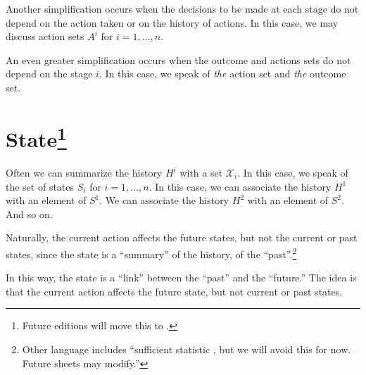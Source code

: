 Another simplification occurs when the decisions to be made at each stage do not depend on the action taken or on the history of actions.
In this case, we may discuss action sets $A^i$ for $i = 1, \dots , n$.

An even greater simplification occurs when the outcome and actions sets do not depend on the stage $i$.
In this case, we speak of \textit{the} action set and \textit{the} outcome set.

\section*{State\footnote{Future editions will move this to .}}

Often we can summarize the history $H^i$ with a set $\mathcal{X} _i$.
In this case, we speak of the set of states $S_i$ for $i = 1, \dots , n$.
In this case, we can associate the history $H^1$ with an element of $S^1$.
We can associate the history $H^2$ with an element of $S^2$.
And so on.

Naturally, the current action affects the future states, but not the current or past states, since the state is a ``summary'' of the history, of the ``past''.\footnote{Other language includes ``sufficient statistic , but we will avoid this for now. Future sheets may modify.''}

In this way, the state is a ``link'' between the ``past'' and the ``future.''
The idea is that the current action affects the future state, but not current or past states.

